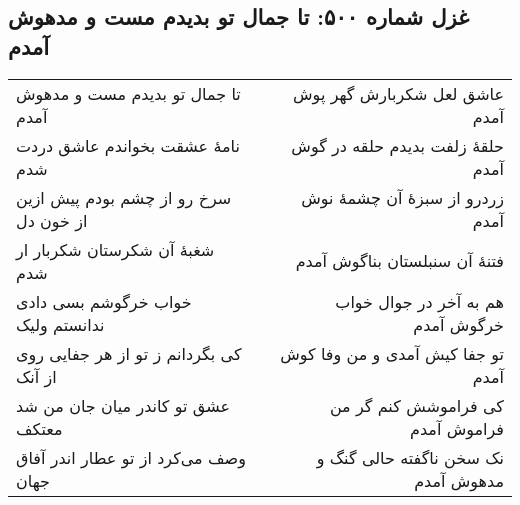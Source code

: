 \begin{center}
\section*{غزل شماره ۵۰۰: تا جمال تو بدیدم مست و مدهوش آمدم}
\label{sec:500}
\begin{longtable}{l p{0.5cm} r}
تا جمال تو بدیدم مست و مدهوش آمدم
&&
عاشق لعل شکربارش گهر پوش آمدم
\\
نامهٔ عشقت بخواندم عاشق دردت شدم
&&
حلقهٔ زلفت بدیدم حلقه در گوش آمدم
\\
سرخ رو از چشم بودم پیش ازین از خون دل
&&
زردرو از سبزهٔ آن چشمهٔ نوش آمدم
\\
شغبهٔ آن شکرستان شکربار ار شدم
&&
فتنهٔ آن سنبلستان بناگوش آمدم
\\
خواب خرگوشم بسی دادی ندانستم ولیک
&&
هم به آخر در جوال خواب خرگوش آمدم
\\
کی بگردانم ز تو از هر جفایی روی از آنک
&&
تو جفا کیش آمدی و من وفا کوش آمدم
\\
عشق تو کاندر میان جان من شد معتکف
&&
کی فراموشش کنم گر من فراموش آمدم
\\
وصف می‌کرد از تو عطار اندر آفاق جهان
&&
نک سخن ناگفته حالی گنگ و مدهوش آمدم
\\
\end{longtable}
\end{center}
